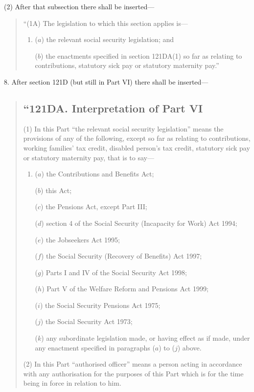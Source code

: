 \documentclass[12pt,a4paper]{article}
\begin{document}
(2) After that subsection there shall be inserted—
\begin{quotation}
“(1A) The legislation to which this section applies is—
\begin{enumerate}\item[]
($a$) the relevant social security legislation; and

($b$) the enactments specified in section 121DA(1)  so far as relating to contributions, statutory sick pay or statutory maternity pay.”
\end{enumerate}
\end{quotation}

\medskip

8. After section 121D (but still in Part VI) there shall be inserted—
\begin{quotation}
\subsection*{“121DA. Interpretation of Part VI}

(1) In this Part “the relevant social security legislation” means the provisions of any of the following, except so far as relating to contributions, working families' tax credit, disabled person’s tax credit, statutory sick pay or statutory maternity pay, that is to say—
\begin{enumerate}\item[]
($a$) the Contributions and Benefits Act;

($b$) this Act;

($c$) the Pensions Act, except Part III;

($d$) section 4 of the Social Security (Incapacity for Work) Act 1994;

($e$) the Jobseekers Act 1995;

($f$) the Social Security (Recovery of Benefits) Act 1997;

($g$) Parts I and IV of the Social Security Act 1998;

($h$) Part V of the Welfare Reform and Pensions Act 1999;

($i$) the Social Security Pensions Act 1975;

($j$) the Social Security Act 1973;

($k$) any subordinate legislation made, or having effect as if made, under any enactment specified in paragraphs ($a$)  to ($j$)  above.
\end{enumerate}

(2) In this Part “authorised officer” means a person acting in accordance with any authorisation for the purposes of this Part which is for the time being in force in relation to him.


\end{quotation}
\end{document}
